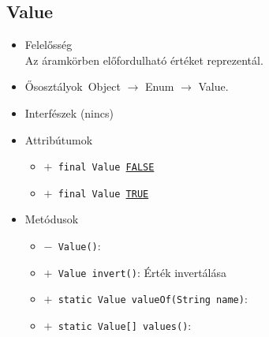\subsection{Value}
\begin{itemize}
\item Felelősség\\
Az áramkörben előfordulható értéket reprezentál.
\item Ősosztályok\ Object $\rightarrow{}$ Enum $\rightarrow{}$ Value.
\item Interfészek (nincs)
\item Attribútumok $\ $
\begin{itemize}
	\item[] \texttt{$+$ final Value \underline{FALSE}} 
	\item[] \texttt{$+$ final Value \underline{TRUE}} 
\end{itemize}
\item Metódusok$\ $
\begin{itemize}
	\item[] \texttt{$-$ Value()}: 
	\item[] \texttt{$+$ Value invert()}: Érték invertálása
	\item[] \texttt{$+$ static Value valueOf(String name)}: 
	\item[] \texttt{$+$ static Value[] values()}: 
\end{itemize}
\end{itemize}

